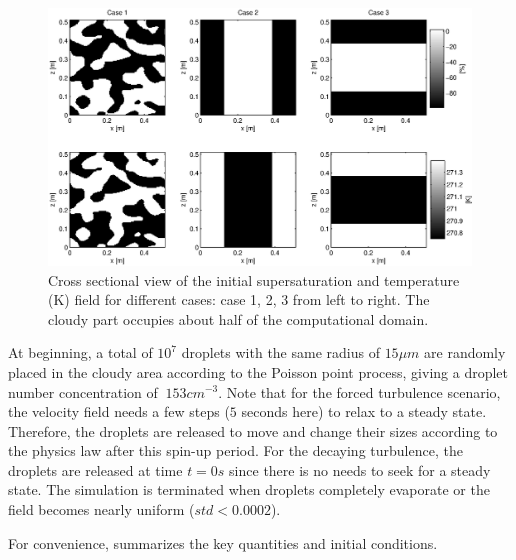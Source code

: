 \begin{figure}\centering
\includegraphics[width=0.9\linewidth]{Figures/init_vapor_supersat}
\caption{Cross sectional view of the initial supersaturation and temperature (K) field for different cases: case 1, 2, 3 from left to right. The cloudy part occupies about half of the computational domain.\label{fig:slice_case123}}
\end{figure}

At beginning, a total of $10^{7}$ droplets with the same radius of $15\mu m$  are randomly placed in the cloudy area according to the Poisson point process, giving a droplet number concentration of $ ~ 153{cm}^{-3}$. Note that for the forced turbulence scenario, the velocity field needs a few steps ($5$ seconds here) to relax to a steady state. Therefore, the droplets are released to move and change their sizes according to the physics law after this spin-up period. For the decaying turbulence, the droplets are released at time $t = 0s$ since there is no needs to seek for a steady state. The simulation is terminated when droplets completely evaporate or the field becomes nearly uniform ($std < 0.0002$). 

For convenience,  summarizes the key quantities and initial conditions.
\begin{table}\centering
{}
\caption{Summary of key model parameters and initial conditions}
\label{tb:parameters}
\end{table}

